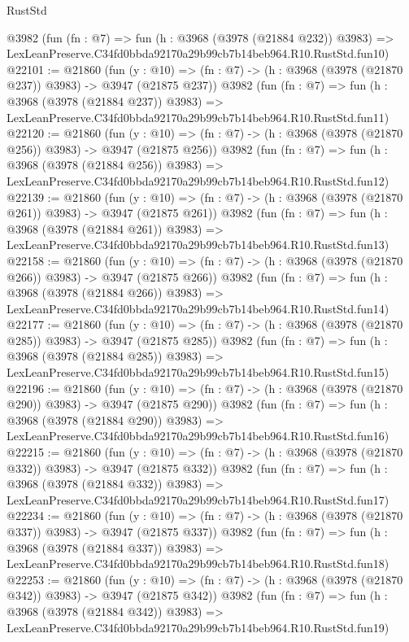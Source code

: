 \begin{lexlean}{RustStd}
\begin{coremodule}
    @3982
    (fun (fn : @7) =>
    fun (h : @3968 (@3978 (@21884 @232)) @3983) =>
    LexLeanPreserve.C34fd0bbda92170a29b99cb7b14beb964.R10.RustStd.fun10)
@22101 := @21860
    (fun (y : @10) => (fn : @7) -> (h : @3968 (@3978 (@21870 @237)) @3983) -> @3947 (@21875 @237))
    @3982
    (fun (fn : @7) =>
    fun (h : @3968 (@3978 (@21884 @237)) @3983) =>
    LexLeanPreserve.C34fd0bbda92170a29b99cb7b14beb964.R10.RustStd.fun11)
@22120 := @21860
    (fun (y : @10) => (fn : @7) -> (h : @3968 (@3978 (@21870 @256)) @3983) -> @3947 (@21875 @256))
    @3982
    (fun (fn : @7) =>
    fun (h : @3968 (@3978 (@21884 @256)) @3983) =>
    LexLeanPreserve.C34fd0bbda92170a29b99cb7b14beb964.R10.RustStd.fun12)
@22139 := @21860
    (fun (y : @10) => (fn : @7) -> (h : @3968 (@3978 (@21870 @261)) @3983) -> @3947 (@21875 @261))
    @3982
    (fun (fn : @7) =>
    fun (h : @3968 (@3978 (@21884 @261)) @3983) =>
    LexLeanPreserve.C34fd0bbda92170a29b99cb7b14beb964.R10.RustStd.fun13)
@22158 := @21860
    (fun (y : @10) => (fn : @7) -> (h : @3968 (@3978 (@21870 @266)) @3983) -> @3947 (@21875 @266))
    @3982
    (fun (fn : @7) =>
    fun (h : @3968 (@3978 (@21884 @266)) @3983) =>
    LexLeanPreserve.C34fd0bbda92170a29b99cb7b14beb964.R10.RustStd.fun14)
@22177 := @21860
    (fun (y : @10) => (fn : @7) -> (h : @3968 (@3978 (@21870 @285)) @3983) -> @3947 (@21875 @285))
    @3982
    (fun (fn : @7) =>
    fun (h : @3968 (@3978 (@21884 @285)) @3983) =>
    LexLeanPreserve.C34fd0bbda92170a29b99cb7b14beb964.R10.RustStd.fun15)
@22196 := @21860
    (fun (y : @10) => (fn : @7) -> (h : @3968 (@3978 (@21870 @290)) @3983) -> @3947 (@21875 @290))
    @3982
    (fun (fn : @7) =>
    fun (h : @3968 (@3978 (@21884 @290)) @3983) =>
    LexLeanPreserve.C34fd0bbda92170a29b99cb7b14beb964.R10.RustStd.fun16)
@22215 := @21860
    (fun (y : @10) => (fn : @7) -> (h : @3968 (@3978 (@21870 @332)) @3983) -> @3947 (@21875 @332))
    @3982
    (fun (fn : @7) =>
    fun (h : @3968 (@3978 (@21884 @332)) @3983) =>
    LexLeanPreserve.C34fd0bbda92170a29b99cb7b14beb964.R10.RustStd.fun17)
@22234 := @21860
    (fun (y : @10) => (fn : @7) -> (h : @3968 (@3978 (@21870 @337)) @3983) -> @3947 (@21875 @337))
    @3982
    (fun (fn : @7) =>
    fun (h : @3968 (@3978 (@21884 @337)) @3983) =>
    LexLeanPreserve.C34fd0bbda92170a29b99cb7b14beb964.R10.RustStd.fun18)
@22253 := @21860
    (fun (y : @10) => (fn : @7) -> (h : @3968 (@3978 (@21870 @342)) @3983) -> @3947 (@21875 @342))
    @3982
    (fun (fn : @7) =>
    fun (h : @3968 (@3978 (@21884 @342)) @3983) =>
    LexLeanPreserve.C34fd0bbda92170a29b99cb7b14beb964.R10.RustStd.fun19)

\end{coremodule}
\end{lexlean}

